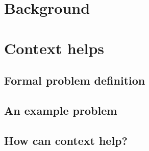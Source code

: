


\section{Background}

\section{Context helps \name}

\subsection{Formal problem definition}

\subsection{An example problem}

\subsection{How can context help?}


